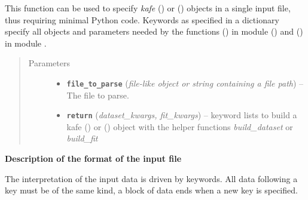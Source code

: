 \documentclass[a4paper,10pt,english]{sphinxmanual}
\begin{document}

\begin{fulllineitems}
\label{index:kafe.file_tools.parse_general_inputfile}
This function can be used to specify \emph{kafe}
{\hyperref[index:kafe.dataset.Dataset]{\emph{}}} () or {\hyperref[index:kafe.fit.Fit]{\emph{}}} () objects
in a single input file, thus requiring minimal Python code. Keywords as
specified in a dictionary  specify all objects and parameters
needed by the functions {\hyperref[index:kafe.dataset_tools.build_dataset]{\emph{}}} () in
module {\hyperref[index:module-kafe.dataset]{\emph{}}} () and {\hyperref[index:kafe.fit.build_fit]{\emph{}}} () in
module .
\begin{quote}\begin{description}
\item[{Parameters}] \leavevmode\begin{itemize}
\item {} 
\textbf{\texttt{file\_to\_parse}} (\emph{file-like object or string containing a file path}) -- The file to parse.

\item {} 
\textbf{\texttt{return}} (\emph{dataset\_kwargs, fit\_kwargs}) -- keyword lists to build a kafe {\hyperref[index:kafe.dataset.Dataset]{\emph{}}} () or
{\hyperref[index:kafe.fit.Fit]{\emph{}}} () object with the helper functions
\emph{build\_dataset} or \emph{build\_fit}

\end{itemize}

\end{description}\end{quote}

\textbf{Description of the format of the input file}

The interpretation of the input data is driven by keywords.
All data following a key must be of the same kind, a block of
data ends when a new key is specified.


\end{fulllineitems}
\end{document}
